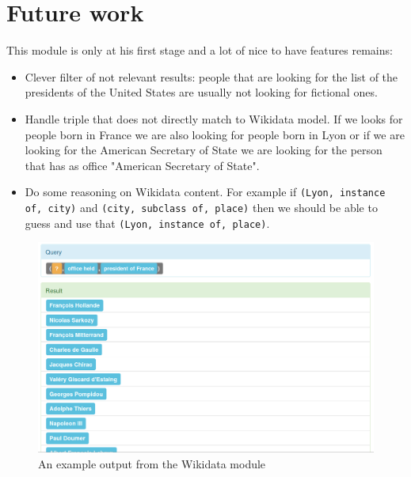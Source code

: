 \section{Future work}
This module is only at his first stage and a lot of nice to have features remains:
\begin{itemize}
    \item Clever filter of not relevant results: people that are looking for the list of the presidents of the United States are usually not looking for fictional ones.
    \item Handle triple that does not directly match to Wikidata model. If we looks for people born in France we are also looking for people born in Lyon or if we are looking for the American Secretary of State we are looking for the person that has as office "American Secretary of State".
    \item Do some reasoning on Wikidata content. For example if \texttt{(Lyon, instance of, city)} and \texttt{(city, subclass of, place)} then we should be able to guess and use that \texttt{(Lyon, instance of, place)}.
\end{itemize}

\begin{figure}[!ht]
  \centering
    \label{wikidata:struct}
    \caption{An example output from the Wikidata module}
    \includegraphics[width=\textwidth]{./wikidata_list_presidents.png}
\end{figure}
